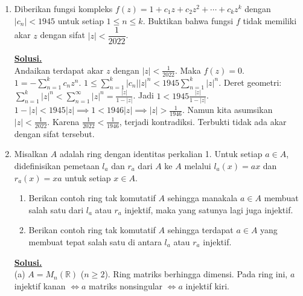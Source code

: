 \documentclass[12pt,twoside]{article}
\newenvironment{solution}
{
	\par\noindent\textbf{\underline{Solusi.}}\\
}
{
	\par
}
\begin{document}
\begin{enumerate}
\begin{solution}
          (1) Kontinuitas Kiri ($x \to x_0^-$):
          Ambil $x \in (x_0-\delta, x_0)$.
          $p(x) = \sup_{t<x} f(t)$.
          Karena $t$ bisa dipilih sedekat mungkin (tetapi kurang dari) $x_0$, dan untuk $t \approx x_0$, $f(t) \approx f(x_0)$.
          Secara formal, untuk $x_0-\delta < t < x < x_0$, $f(t) > f(x_0)-\epsilon$.
          Maka $p(x) \ge f(x_0)-\epsilon$.
          Juga $p(x) \le \sup_{t<x_0} f(t) \le f(x_0)+\epsilon$ (jika kita asumsikan $f$ tidak melonjak jauh sebelumnya, tapi kita hanya peduli lokal).
          Sebenarnya, $p(x_0) = \sup_{t<x_0} f(t)$.
          Jika $x$ mendekati $x_0$ dari kiri, $p(x)$ konvergen ke $p(x_0)$.

          (2) Kontinuitas Kanan ($x \to x_0^+$):
          Untuk $x > x_0$, $p(x) = \max(p(x_0), \sup_{x_0 \le t < x} f(t))$.
          Untuk $x$ dekat $x_0$, $\sup_{x_0 \le t < x} f(t)$ mendekati $f(x_0)$.
          Kita tahu $p(x_0) \ge f(x_0)$ (limit kiri dari $f$ adalah $f(x_0)$).
          Maka $\max(p(x_0), f(x_0)) = p(x_0)$.
          Jadi $\lim_{x \to x_0^+} p(x) = p(x_0)$.

          Kesimpulan: $p$ kontinu di $x_0$.
        \end{solution}
  \item Diberikan fungsi kompleks
        $ f(z)=1+c_1z+c_2z^2+\cdots +c_kz^k $
        dengan $|c_n|<1945$ untuk setiap $1\leq n\leq k$. Buktikan bahwa fungsi $f$ tidak memiliki akar $z$ dengan sifat $ |z|<\dfrac{1}{2022} $.
        \begin{solution}
          Andaikan terdapat akar $z$ dengan $|z| < \frac{1}{2022}$. Maka $f(z)=0$.
          $1 = - \sum_{n=1}^k c_n z^n$.
          $1 \le \sum_{n=1}^k |c_n| |z|^n < 1945 \sum_{n=1}^k |z|^n$.
          Deret geometri: $\sum_{n=1}^k |z|^n < \sum_{n=1}^\infty |z|^n = \frac{|z|}{1-|z|}$.
          Jadi $1 < 1945 \frac{|z|}{1-|z|}$.
          $1-|z| < 1945 |z| \implies 1 < 1946 |z| \implies |z| > \frac{1}{1946}$.
          Namun kita asumsikan $|z| < \frac{1}{2022}$.
          Karena $\frac{1}{2022} < \frac{1}{1946}$, terjadi kontradiksi.
          Terbukti tidak ada akar dengan sifat tersebut.
        \end{solution}
  \item Misalkan $A$ adalah ring dengan identitas perkalian 1. Untuk setiap $a\in A$, didefinisikan pemetaan $l_a$ dan $r_a$ dari $A$ ke $A$ melalui $l_a(x)=ax$ dan $r_a(x)=xa$ untuk setiap $x\in A$.
        \begin{enumerate}
          \item Berikan contoh ring tak komutatif $A$ sehingga manakala $a\in A$ membuat salah satu dari $l_a$ atau $r_a$ injektif, maka yang satunya lagi juga injektif.
          \item Berikan contoh ring tak komutatif $A$ sehingga terdapat $a\in A$ yang membuat tepat salah satu di antara $l_a$ atau $r_a$ injektif.
        \end{enumerate}
        \begin{solution}
          (a) $A = M_n(\mathbb{R})$ ($n \ge 2$). Ring matriks berhingga dimensi.
          Pada ring ini, $a$ injektif kanan $\iff a$ matriks nonsingular $\iff a$ injektif kiri.


\end{solution}
\end{enumerate}
\end{document}
